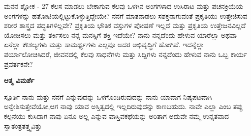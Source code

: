 \newpage
\begin{mananam}{\mananamfont ಮನನ ಶ್ಲೋಕ - \textenglish{27}}
\footnotesize \mananamtext ಕೆಲಸ ಮಾಡಲು ಬೇಕಾಗುವ ಕೆಲವು ಒಳಗಿನ ಅಂಗಗಳಾದ ಉಸಿರಾಟ ಮತ್ತು ಪಚನಕ್ರಿಯೆಯ ಅಂಗಗಳನ್ನು ಹತೋಟಿಯಲ್ಲಿಟ್ಟುಕೊಳ್ಳುತ್ತಿದ್ದೇಯೇ? ನನಗೆ ಮಾತನಾಡಲು ಸಶಕ್ತನಾಗುವಂತೆ ಪ್ರಕೃತಿಯು ಉತ್ತೇಜಿಸುವ ಶರೀರ ಶಾಸ್ತ್ರದ ಪದ್ಧತಿಗಳಿಲ್ಲವೇ? ಪ್ರಕೃತಿಯ ಭೌತಿಕ ವಸ್ತುಗಳ ಪೋಷಣೆ ಇಲ್ಲದೆ ಮತ್ತು ಪ್ರಕೃತಿಯ ಉತ್ತೇಜನವಿಲ್ಲದೆ ಯೋಚಿಸಲು ಮತ್ತು ತರ್ಕಿಸಲು ನನ್ನ ಮನಸ್ಸಿಗೆ ಶಕ್ತಿ ಇದೆಯೇ? ನಾನು ನನ್ನದೆಂದು ಹೇಳುವ ಯಾರೆಲ್ಲಾ ಅಥವಾ ಏನೆಲ್ಲಾ ಕೌಶಲ್ಯಗಳು ಮತ್ತು ಸಾಮರ್ಥ್ಯಗಳು ಎಲ್ಲವೂ ಅದರ ಅಭಿವೃದ್ಧಿಗೆ ಹೋಗಿವೆ. ಇದನ್ನೆಲ್ಲಾ ಪರ್ಯಾಲೋಚಿಸಿದರೆ, ಜೀವನದಲ್ಲಿ ಕೆಲವು ಸಾಧನೆಗಳು ಮತ್ತು ಸಿದ್ದಿಗಳು ನನ್ನದೆಂದು ಹೇಳುವ ನಾನು ಒಬ್ಬ ಕಾರ್ಯ ಪ್ರವರ್ತಕನೇ?
\end{mananam}
\WritingHand\enspace\textbf{ಆತ್ಮ ವಿಮರ್ಶೆ}\\
\begin{inspiration}{\mananamfont ಸ್ಪೂರ್ತಿ}
\footnotesize \mananamtext ನಾನು ಮತ್ತು ನನಗೆ ಎನ್ನುವುದನ್ನು ಒಳಗೊಂಡಿರುವುದನ್ನು ನಾನು ಯಾವಾಗ ನಿಷ್ಕಪಟವಾಗಿ ಅನ್ವೇಶಿಸುತ್ತೇವೆಯೋ,ಆಗ ನಾವು ಯಾವ ಅಸ್ತಿತ್ವದಲ್ಲಿ ಇಲ್ಲದಿರುವುದನ್ನು ಕಾಣಬಹುದು. ನಾವೇ ಎಲ್ಲಾ ಎಂಬ ತಪ್ಪು ಕಲ್ಪನೆಯು ಕುಸಿದಾಗ ನಾವು ಏನೂ ಅಲ್ಲ ಎನ್ನುವ ವಾಸ್ತಿವಕಥೆಯನ್ನು ಅರಿತಾಗ ಅದುವೇ ನಮ್ಮ ಉನ್ನತವಾದ ಸ್ವಾತಂತ್ರತತ್ತ್ವವಿತ್ತು 
\end{inspiration}
\newpage
 

